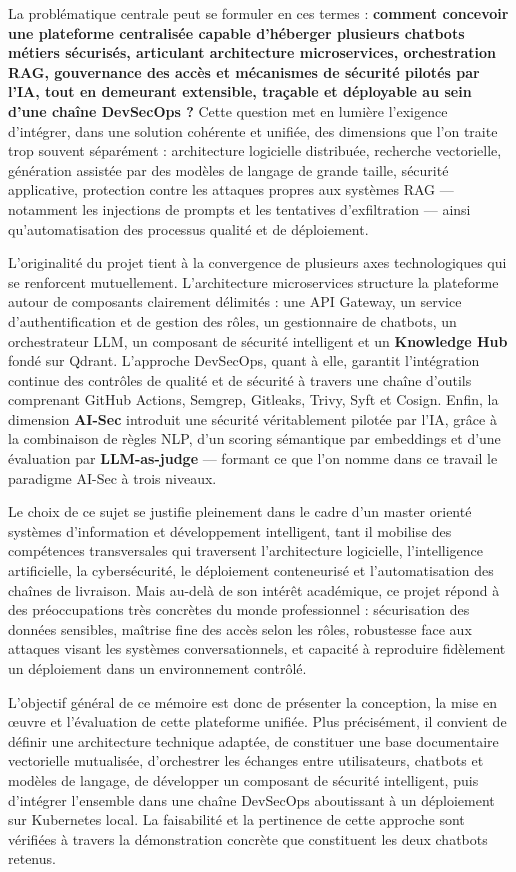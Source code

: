 La problématique centrale peut se formuler en ces termes : \textbf{comment concevoir une plateforme centralisée capable d'héberger plusieurs chatbots métiers sécurisés, articulant architecture microservices, orchestration RAG, gouvernance des accès et mécanismes de sécurité pilotés par l'IA, tout en demeurant extensible, traçable et déployable au sein d'une chaîne DevSecOps ?} Cette question met en lumière l'exigence d'intégrer, dans une solution cohérente et unifiée, des dimensions que l'on traite trop souvent séparément : architecture logicielle distribuée, recherche vectorielle, génération assistée par des modèles de langage de grande taille, sécurité applicative, protection contre les attaques propres aux systèmes RAG — notamment les injections de prompts et les tentatives d'exfiltration — ainsi qu'automatisation des processus qualité et de déploiement.

L'originalité du projet tient à la convergence de plusieurs axes technologiques qui se renforcent mutuellement. L'architecture microservices structure la plateforme autour de composants clairement délimités : une API Gateway, un service d'authentification et de gestion des rôles, un gestionnaire de chatbots, un orchestrateur LLM, un composant de sécurité intelligent et un \textbf{Knowledge Hub} fondé sur Qdrant. L'approche DevSecOps, quant à elle, garantit l'intégration continue des contrôles de qualité et de sécurité à travers une chaîne d'outils comprenant GitHub Actions, Semgrep, Gitleaks, Trivy, Syft et Cosign. Enfin, la dimension \textbf{AI-Sec} introduit une sécurité véritablement pilotée par l'IA, grâce à la combinaison de règles NLP, d'un scoring sémantique par embeddings et d'une évaluation par \textbf{LLM-as-judge} — formant ce que l'on nomme dans ce travail le paradigme AI-Sec à trois niveaux.

Le choix de ce sujet se justifie pleinement dans le cadre d'un master orienté systèmes d'information et développement intelligent, tant il mobilise des compétences transversales qui traversent l'architecture logicielle, l'intelligence artificielle, la cybersécurité, le déploiement conteneurisé et l'automatisation des chaînes de livraison. Mais au-delà de son intérêt académique, ce projet répond à des préoccupations très concrètes du monde professionnel : sécurisation des données sensibles, maîtrise fine des accès selon les rôles, robustesse face aux attaques visant les systèmes conversationnels, et capacité à reproduire fidèlement un déploiement dans un environnement contrôlé.

L'objectif général de ce mémoire est donc de présenter la conception, la mise en œuvre et l'évaluation de cette plateforme unifiée. Plus précisément, il convient de définir une architecture technique adaptée, de constituer une base documentaire vectorielle mutualisée, d'orchestrer les échanges entre utilisateurs, chatbots et modèles de langage, de développer un composant de sécurité intelligent, puis d'intégrer l'ensemble dans une chaîne DevSecOps aboutissant à un déploiement sur Kubernetes local. La faisabilité et la pertinence de cette approche sont vérifiées à travers la démonstration concrète que constituent les deux chatbots retenus.

